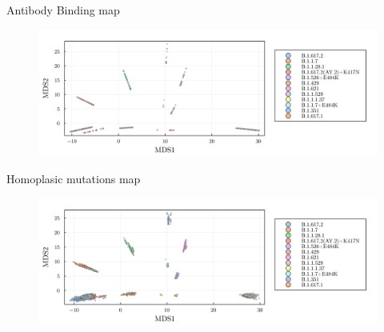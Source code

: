 \documentclass{beamer}
\begin{document}
\begin{frame}{Antibody Binding map}
    \begin{figure}
        \centering
        \includegraphics[width=1.1\textwidth]{my_figs/binding_usa_multidimensional_scaling.png}
    \end{figure}
\end{frame}

%         

\begin{frame}{Homoplasic mutations map}
    \begin{figure}
        \centering

        \includegraphics[width=1.1\textwidth]{my_figs/homoplasy_usa_multidimensional_scaling.png}
    \end{figure}
\end{frame}
\end{document}
